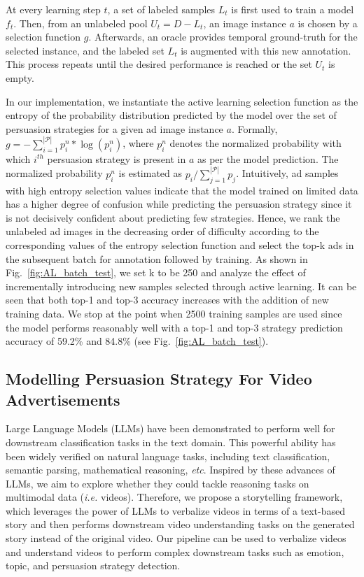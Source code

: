 \documentclass[hidelinks,11pt,a4paper]{report}
\begin{document}
At every learning step $t$, a set of labeled samples $L_t$ is first used to train a model
$f_t$. Then, from an unlabeled pool $U_t=D-L_t$, an image instance $a$ is chosen by a selection function $g$. Afterwards, an oracle provides temporal ground-truth for the selected instance, and the labeled set $L_t$ is augmented with this new annotation. This process repeats until the desired performance is reached or the set $U_t$ is empty.

In our implementation, we instantiate the active learning selection function as the entropy of the probability distribution predicted by the model over the set of persuasion strategies for a given ad image instance $a$. Formally, $g = -\sum_{i=1}^{|\mathcal{P}|}p^{n}_{i}*\log(p^{n}_i)$, where $p^{n}_i$ denotes the normalized probability with which $i^{th}$ persuasion strategy is present in $a$ as per the model prediction. The normalized probability $p^{n}_{i}$ is estimated as $p_i/\sum_{j=1}^{|\mathcal{P}|}p_j$. Intuitively, ad samples with high entropy selection values indicate that the model trained on limited data has a higher degree of confusion while predicting the persuasion strategy since it is not decisively confident about predicting few strategies. Hence, we rank the unlabeled ad images in the decreasing order of difficulty according to the corresponding values of the entropy selection function and select the top-k ads in the subsequent batch for annotation followed by training. As shown in Fig.~\ref{fig:AL_batch_test}, we set k to be 250 and analyze the effect of incrementally introducing new samples selected through active learning. It can be seen that both top-1 and top-3 accuracy increases with the addition of new training data. We stop at the point when 2500 training samples are used since the model performs reasonably well with a top-1 and top-3 strategy prediction accuracy of 59.2\% and 84.8\% (see Fig.~\ref{fig:AL_batch_test}). 






\subsection{Modelling Persuasion Strategy For Video Advertisements}
Large Language Models (LLMs) have been demonstrated to perform well for downstream classification tasks in the text domain. This powerful ability has been widely verified on natural language tasks, including text classification, semantic parsing, mathematical reasoning, \textit{etc}. Inspired by these advances of LLMs, we aim to explore whether they could tackle reasoning tasks on multimodal data (\textit{i.e.} videos). Therefore, we propose a storytelling framework, which leverages the power of LLMs to verbalize videos in terms of a text-based story and then performs downstream video understanding tasks on the generated story instead of the original video. Our pipeline can be used to verbalize videos and understand videos to perform complex downstream tasks such as emotion, topic, and persuasion strategy detection. 
\end{document}
